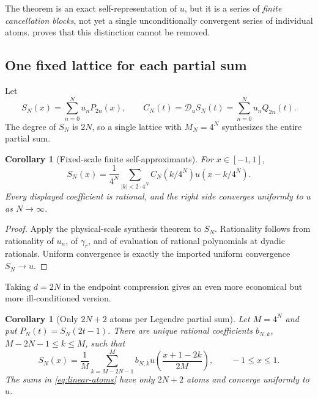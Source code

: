 \documentclass[11pt]{article}
\newtheorem{corollary}[theorem]{Corollary}
\theoremstyle{definition}
\theoremstyle{remark}
\newcommand{\Dscr}{\mathscr D_{u}}
\begin{document}
The theorem is an exact self-representation of $u$, but it is a series of
\emph{finite cancellation blocks}, not yet a single unconditionally convergent
series of individual atoms.   proves that this
distinction cannot be removed.

\subsection{One fixed lattice for each partial sum}

Let
\begin{equation}
 S_N(x)=\sum_{n=0}^{N}u_nP_{2n}(x),
 \qquad
 C_N(t)=\Dscr S_N(t)=\sum_{n=0}^{N}u_nQ_{2n}(t).
 \label{eq:SN-CN}
\end{equation}
The degree of $S_N$ is $2N$, so a single lattice with $M_N=4^N$ synthesizes the
entire partial sum.

\begin{corollary}[Fixed-scale finite self-approximants]
\label{cor:fixed-scale}
For $x\in[-1,1]$,
\begin{equation}
 \boxed{
 S_N(x)=\frac1{4^N}
 \sum_{|k|<2\cdot4^N}C_N(k/4^N)u(x-k/4^N).}
 \label{eq:fixed-scale}
\end{equation}
Every displayed coefficient is rational, and the right side converges
uniformly to $u$ as $N\to\infty$.
\end{corollary}

\begin{proof}
Apply the physical-scale synthesis theorem to $S_N$.  Rationality follows from
rationality of $u_n$, of $\gamma_r$, and of evaluation of rational
polynomials at dyadic rationals.  Uniform convergence is exactly the imported
uniform convergence $S_N\to u$.
\end{proof}

Taking $d=2N$ in the endpoint compression gives an even more economical but
more ill-conditioned version.

\begin{corollary}[Only \texorpdfstring{$2N+2$}{2N+2} atoms per Legendre partial sum]
\label{cor:linear-atoms}
Let $M=4^N$ and put $P_N(t)=S_N(2t-1)$.  There are unique rational coefficients
$b_{N,k}$, $M-2N-1\le k\le M$, such that
\begin{equation}
 \boxed{
 S_N(x)=\frac1M\sum_{k=M-2N-1}^{M}b_{N,k}
 u\!\left(\frac{x+1-2k}{2M}\right),
 \qquad -1\le x\le1.}
 \label{eq:linear-atoms}
\end{equation}
The sums in \eqref{eq:linear-atoms} have only $2N+2$ atoms and converge
uniformly to $u$.
\end{corollary}
\end{document}
